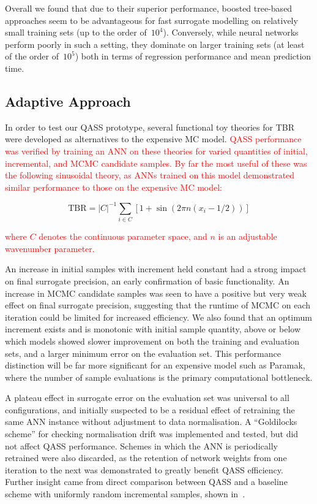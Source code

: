 Overall we found that due to their superior performance, boosted tree-based
approaches seem to be advantageous for fast surrogate modelling on relatively small training
sets (up to the order of~$10^4$). Conversely, while neural networks perform
poorly in such a setting, they dominate on larger training sets (at least of the
order of~$10^5$) both in terms of regression performance and mean prediction time.

\subsection{Adaptive Approach}\label{sec:adaptiveres}


In order to test our QASS prototype, several functional toy theories for TBR were developed as alternatives to the expensive MC model. \textcolor{red}{QASS performance was verified by training an ANN on
these theories for varied quantities of initial, incremental, and MCMC
candidate samples. By far the most useful
of these was the following sinusoidal theory, as ANNs trained on this model demonstrated similar performance to those on the expensive
MC model:}

\begin{equation}
	\text{TBR} = |C|^{-1}\sum_{i \in C} \left[1 + \sin(2\pi n (x_i - 1/2)) \right]
\end{equation}

\textcolor{red}{where $C$ denotes the continuous parameter space, and $n$ is an adjustable wavenumber parameter.}

An increase in initial samples with increment held constant had a strong impact
on final surrogate precision, an early confirmation of basic functionality. An
increase in MCMC candidate samples was seen to have a positive but very weak
effect on final surrogate precision, suggesting that the runtime of MCMC on each
iteration could be limited for increased efficiency. We also found that an optimum increment exists and is monotonic with initial sample quantity, above or below which models showed slower improvement on both the training and evaluation sets, and a larger minimum error on the
evaluation set. This performance distinction will be far more
significant for an expensive model such as Paramak, where the number of sample
evaluations is the primary computational bottleneck.

A plateau effect in surrogate error on the evaluation set was universal to all configurations, and initially suspected to be a residual
effect of retraining the same ANN instance without adjustment to data
normalisation. A ``Goldilocks scheme'' for checking normalisation drift was
implemented and tested, but did not affect QASS performance. Schemes in which
the ANN is periodically retrained were also discarded, as the retention of
network weights from one iteration to the next was demonstrated to greatly
benefit QASS efficiency. Further insight came from direct comparison between
QASS and a baseline scheme with uniformly random incremental samples, shown
in~.

